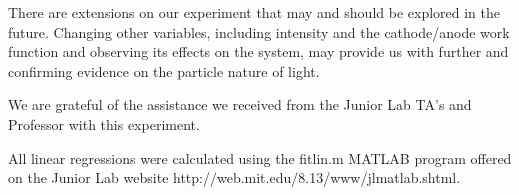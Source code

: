 \documentclass[aps,twocolumn,secnumarabic,nobalancelastpage,amsmath,amssymb,
nofootinbib]{revtex4}
\begin{document}
There are extensions on our experiment that may and should be explored in the future.  Changing other variables, including intensity and the cathode/anode work function and observing its effects on the system, may provide us with further and confirming evidence on the particle nature of light.




\begin{acknowledgments} We are grateful of the assistance we received from the Junior Lab TA's and Professor with this experiment.

All linear regressions were calculated using the fitlin.m MATLAB program offered on the Junior Lab website http://web.mit.edu/8.13/www/jlmatlab.shtml.
\end{acknowledgments}

\end{document}
